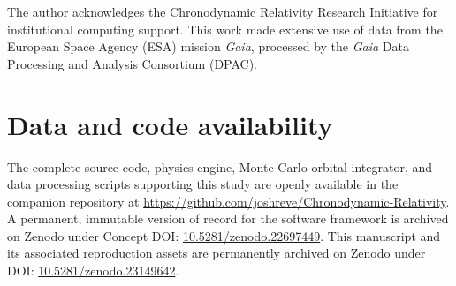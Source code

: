 \documentclass[aps,prd,reprint,superscriptaddress,nofootinbib,floatfix,amsmath,amssymb]{revtex4-2}
\begin{document}
\begin{acknowledgments}
The author acknowledges the Chronodynamic Relativity Research Initiative for institutional computing support. This work made extensive use of data from the European Space Agency (ESA) mission \textit{Gaia}, processed by the \textit{Gaia} Data Processing and Analysis Consortium (DPAC).
\end{acknowledgments}

\section*{Data and code availability}
The complete source code, physics engine, Monte Carlo orbital integrator, and data processing scripts supporting this study are openly available in the companion repository at \url{https://github.com/joshreve/Chronodynamic-Relativity}. A permanent, immutable version of record for the software framework is archived on Zenodo under Concept DOI: \href{https://doi.org/10.5281/zenodo.22697449}{10.5281/zenodo.22697449}. This manuscript and its associated reproduction assets are permanently archived on Zenodo under DOI: \href{https://doi.org/10.5281/zenodo.23149642}{10.5281/zenodo.23149642}.


\end{document}
